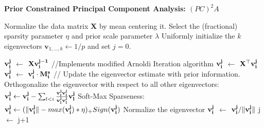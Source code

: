 \documentclass{llncs}
\newcommand{\bs}{\boldsymbol}
\begin{document}
\begin{algorithm}[htdp]
\small \caption{\bf Prior Constrained Principal Component Analysis: $(PC)^2A$}
\label{algo1}
\begin{algorithmic}[1]
\STATE Normalize the data matrix {\bf X} by  mean centering it.
\STATE Select the (fractional) sparsity parameter $\eta$ and prior scale parameter $\lambda$
\STATE Uniformly initialize the $k$ eigenvectors $\bs v_{1,\ldots, k} \gets 1/p$ and set $j=0$.

\STATE ${\bf v_i^{j}}$ $\gets$ ${\bf Xv_i^{j-1}}$ //Implements modified Arnoldi Iteration algorithm
\STATE ${\bf v_i^{j}}$ $\gets$ ${\bf X^{\top}v_i^{j}}$
\STATE ${\bf v_i^{j}}$ $\gets$ ${\bf v_i^{j}}\cdot \bf M^s_i$ // Update the eigenvector estimate with prior information.
\STATE Orthogonalize the eigenvector with respect to all other eigenvectors:\\ ${\bf v_i^{j}} \gets {\bf v_i^{j}} - \sum_{l <i} \frac{\bf v_i^{j} \bf v_l^{j}}{\bf v_l^{j} \bf v_l^{j}}  \bf v_l^{j}$
\STATE Soft-Max Sparseness:  ${\bf v_i^{j}}  \leftarrow (\|{\bf v_i^{j}}\|  - max({\bf v_i^{j}})*\eta)_+ Sign({\bf v_i^{j}})$
\STATE Normalize the eigenvector ${\bf v_i^{j}}$ $\gets$ ${\bf v_i^{j}}/\|{\bf v_i^{j}}\|$
\ENDFOR
\STATE j $\leftarrow$ j+1
\ENDWHILE
\end{algorithmic}
\end{algorithm}








\end{document}
